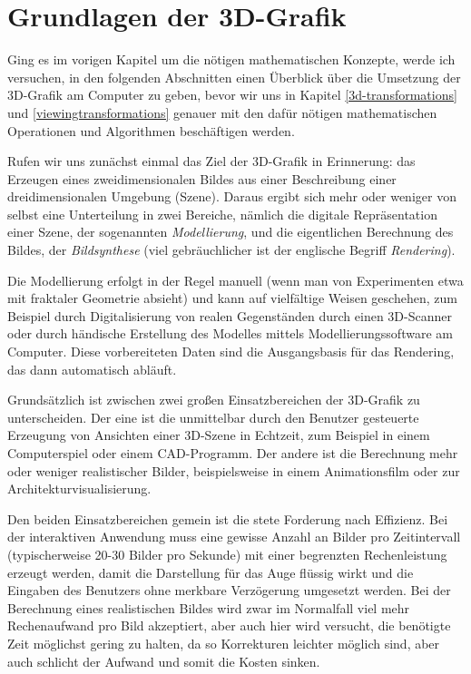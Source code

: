 \chapter{Grundlagen der 3D-Grafik}
\label{grafikgrundlagen}

Ging es im vorigen Kapitel um die nötigen mathematischen Konzepte, werde ich versuchen, in den folgenden Abschnitten einen Überblick über die Umsetzung der 3D-Grafik am Computer zu geben, bevor wir uns in Kapitel \ref{3d-transformations} und \ref{viewingtransformations} genauer mit den dafür nötigen mathematischen Operationen und Algorithmen beschäftigen werden.

Rufen wir uns zunächst einmal das Ziel der 3D-Grafik in Erinnerung: das Erzeugen eines zweidimensionalen Bildes aus einer Beschreibung einer dreidimensionalen Umgebung (Szene). Daraus ergibt sich mehr oder weniger von selbst eine Unterteilung in zwei Bereiche, nämlich die digitale Repräsentation einer Szene, der sogenannten \emph{Modellierung}, und die eigentlichen Berechnung des Bildes, der \emph{Bildsynthese} (viel gebräuchlicher ist der englische Begriff \emph{Rendering}).

Die Modellierung erfolgt in der Regel manuell (wenn man von Experimenten etwa mit fraktaler Geometrie absieht) und kann auf vielfältige Weisen geschehen, zum Beispiel durch Digitalisierung von realen Gegenständen durch einen 3D-Scanner oder durch händische Erstellung des Modelles mittels Modellierungssoftware am Computer. Diese vorbereiteten Daten sind die Ausgangsbasis für das Rendering, das dann automatisch abläuft.

Grundsätzlich ist zwischen zwei großen Einsatzbereichen der 3D-Grafik zu unterscheiden. Der eine ist die unmittelbar durch den Benutzer gesteuerte Erzeugung von Ansichten einer 3D-Szene in Echtzeit, zum Beispiel in einem Computerspiel oder einem CAD-Programm. Der andere ist die Berechnung mehr oder weniger realistischer Bilder, beispielsweise in einem Animationsfilm oder zur Architekturvisualisierung.

Den beiden Einsatzbereichen gemein ist die stete Forderung nach Effizienz. Bei der interaktiven Anwendung muss eine gewisse Anzahl an Bilder pro Zeitintervall (typischerweise 20-30 Bilder pro Sekunde) mit einer begrenzten Rechenleistung erzeugt werden, damit die Darstellung für das Auge flüssig wirkt und die Eingaben des Benutzers ohne merkbare Verzögerung umgesetzt werden. Bei der Berechnung eines realistischen Bildes wird zwar im Normalfall viel mehr Rechenaufwand pro Bild akzeptiert, aber auch hier wird versucht, die benötigte Zeit möglichst gering zu halten, da so Korrekturen leichter möglich sind, aber auch schlicht der Aufwand und somit die Kosten sinken.

